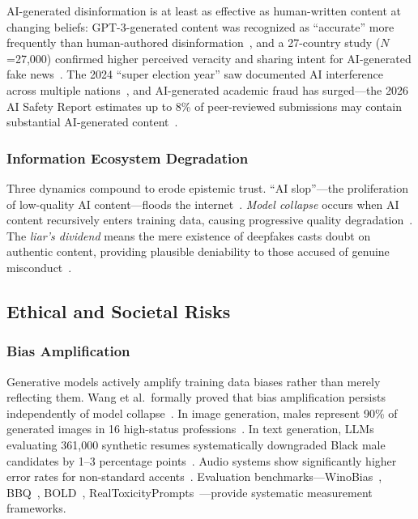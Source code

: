 AI-generated disinformation is at least as effective as human-written content at changing beliefs: GPT-3-generated content was recognized as ``accurate'' more frequently than human-authored disinformation~\cite{spitale2023gpt3}, and a 27-country study ($N$=27,000) confirmed higher perceived veracity and sharing intent for AI-generated fake news~\cite{stefkovics2026fakenews}. The 2024 ``super election year'' saw documented AI interference across multiple nations~\cite{restofworld2024tracker}, and AI-generated academic fraud has surged---the 2026 AI Safety Report estimates up to 8\% of peer-reviewed submissions may contain substantial AI-generated content~\cite{aisafetyreport2026}.


\subsubsection{Information Ecosystem Degradation}
\label{sec:threat-ecosystem}

Three dynamics compound to erode epistemic trust. ``AI slop''---the proliferation of low-quality AI content---floods the internet~\cite{graphite2025aicontent}. \emph{Model collapse} occurs when AI content recursively enters training data, causing progressive quality degradation~\cite{shumailov2024collapse}. The \emph{liar's dividend} means the mere existence of deepfakes casts doubt on authentic content, providing plausible deniability to those accused of genuine misconduct~\cite{chesney2019deepfakes}.


\subsection{Ethical and Societal Risks}
\label{sec:threat-ethics}

\subsubsection{Bias Amplification}
\label{sec:threat-bias}

Generative models actively amplify training data biases rather than merely reflecting them. Wang et al.\ formally proved that bias amplification persists independently of model collapse~\cite{wang2024biasamplification}. In image generation, males represent 90\% of generated images in 16 high-status professions~\cite{sdxl2024bias}. In text generation, LLMs evaluating 361,000 synthetic resumes systematically downgraded Black male candidates by 1--3 percentage points~\cite{pnas2024llmbias}. Audio systems show significantly higher error rates for non-standard accents~\cite{michel2025accentbias}. Evaluation benchmarks---WinoBias~\cite{zhao2018winobias}, BBQ~\cite{parrish2022bbq}, BOLD~\cite{dhamala2021bold}, RealToxicityPrompts~\cite{gehman2020toxicity}---provide systematic measurement frameworks.


